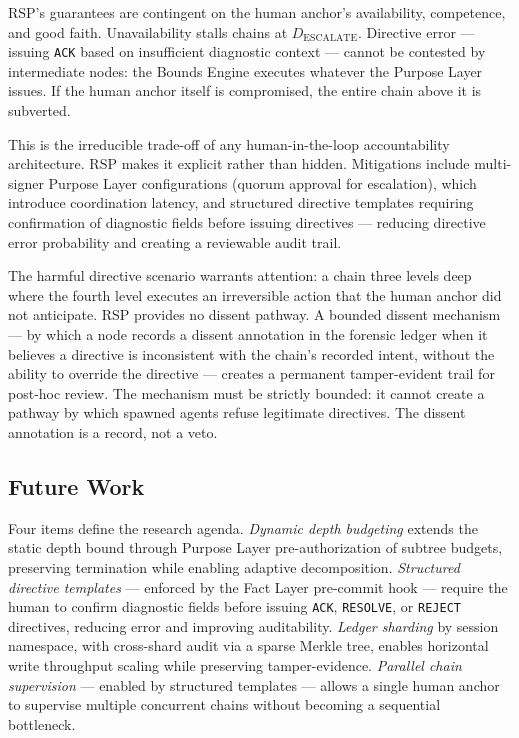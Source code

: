 RSP's guarantees are contingent on the human anchor's availability, competence, and good faith. Unavailability stalls chains at $D_{\text{ESCALATE}}$. Directive error — issuing \texttt{ACK} based on insufficient diagnostic context — cannot be contested by intermediate nodes: the Bounds Engine executes whatever the Purpose Layer issues. If the human anchor itself is compromised, the entire chain above it is subverted.

This is the irreducible trade-off of any human-in-the-loop accountability architecture. RSP makes it explicit rather than hidden. Mitigations include multi-signer Purpose Layer configurations (quorum approval for escalation), which introduce coordination latency, and structured directive templates requiring confirmation of diagnostic fields before issuing directives — reducing directive error probability and creating a reviewable audit trail.

The harmful directive scenario warrants attention: a chain three levels deep where the fourth level executes an irreversible action that the human anchor did not anticipate. RSP provides no dissent pathway. A bounded dissent mechanism — by which a node records a dissent annotation in the forensic ledger when it believes a directive is inconsistent with the chain's recorded intent, without the ability to override the directive — creates a permanent tamper-evident trail for post-hoc review. The mechanism must be strictly bounded: it cannot create a pathway by which spawned agents refuse legitimate directives. The dissent annotation is a record, not a veto.

\subsection{Future Work}
\label{sec:rs-future-work}

Four items define the research agenda. \emph{Dynamic depth budgeting} extends the static depth bound through Purpose Layer pre-authorization of subtree budgets, preserving termination while enabling adaptive decomposition. \emph{Structured directive templates} — enforced by the Fact Layer pre-commit hook — require the human to confirm diagnostic fields before issuing \texttt{ACK}, \texttt{RESOLVE}, or \texttt{REJECT} directives, reducing error and improving auditability. \emph{Ledger sharding} by session namespace, with cross-shard audit via a sparse Merkle tree, enables horizontal write throughput scaling while preserving tamper-evidence. \emph{Parallel chain supervision} — enabled by structured templates — allows a single human anchor to supervise multiple concurrent chains without becoming a sequential bottleneck.

